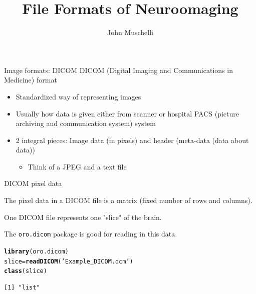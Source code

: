 \documentclass[11pt]{beamer}\usepackage[]{graphicx}\usepackage[]{color}
\author{John Muschelli}
\title{File Formats of Neuroomaging}
\institute{Johns Hopkins Bloomberg School of Public Health}
\makeatletter
\newcommand{\hlstr}[1]{\textcolor[rgb]{0.192,0.494,0.8}{#1}}%
\newcommand{\hlstd}[1]{\textcolor[rgb]{0.345,0.345,0.345}{#1}}%
\newcommand{\hlkwb}[1]{\textcolor[rgb]{0.69,0.353,0.396}{#1}}%
\newcommand{\hlkwd}[1]{\textcolor[rgb]{0.737,0.353,0.396}{\textbf{#1}}}%
\newenvironment{kframe}{%
 \def\at@end@of@kframe{}%
 \ifinner\ifhmode%
  \def\at@end@of@kframe{\end{minipage}}%
  \begin{minipage}{\columnwidth}%
 \fi\fi%
 \def\FrameCommand##1{\hskip\@totalleftmargin \hskip-\fboxsep
 \colorbox{shadecolor}{##1}\hskip-\fboxsep
     \hskip-\linewidth \hskip-\@totalleftmargin \hskip\columnwidth}%
 \MakeFramed {\advance\hsize-\width
   \@totalleftmargin\z@ \linewidth\hsize
   \@setminipage}}%
 {\par\unskip\endMakeFramed%
 \at@end@of@kframe}
\newenvironment{knitrout}{}{} %
\makeatother
\begin{document}
\begin{frame}
\titlepage
\end{frame}




\begin{frame}[fragile]{Image formats: DICOM}
DICOM (Digital Imaging and Communications in Medicine) format

\begin{itemize}
\item Standardized way of representing images
\item Usually how data is given either from scanner or hospital PACS (picture archiving and communication system) system 
\item 2 integral pieces: Image data (in pixels) and header (meta-data (data about data))
\begin{itemize}
	\item Think of a JPEG and a text file
\end{itemize}
\end{itemize}

\end{frame}


\begin{frame}[fragile]{DICOM pixel data}

The pixel data in a DICOM file is a matrix (fixed number of rows and columns). 

One DICOM file represents one "slice" of the brain.

The \verb|oro.dicom| package is good for reading in this data.

\begin{knitrout}
\color{fgcolor}\begin{kframe}
\begin{alltt}
\hlkwd{library}\hlstd{(oro.dicom)}
\hlstd{slice} \hlkwb{=} \hlkwd{readDICOM}\hlstd{(}\hlstr{'Example_DICOM.dcm'}\hlstd{)}
\hlkwd{class}\hlstd{(slice)}
\end{alltt}
\begin{verbatim}
[1] "list"
\end{verbatim}
\end{kframe}
\end{knitrout}

\end{frame}
\end{document}
